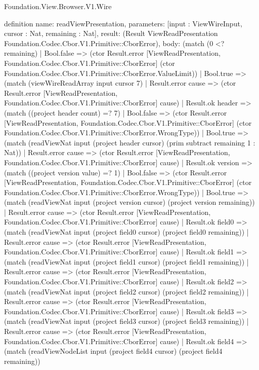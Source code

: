 \begin{lexlean}{Foundation.View.Browser.V1.Wire}
\begin{semanticmodule}
definition{
  name: readViewPresentation,
  parameters: [input : ViewWireInput, cursor : Nat, remaining : Nat],
  result: (Result ViewReadPresentation Foundation.Codec.Cbor.V1.Primitive::CborError),
  body: (match (0 <? remaining)
    | Bool.false => (ctor Result.error [ViewReadPresentation, Foundation.Codec.Cbor.V1.Primitive::CborError] (ctor Foundation.Codec.Cbor.V1.Primitive::CborError.ValueLimit))
    | Bool.true => (match (viewWireReadArray input cursor 7)
      | Result.error cause => (ctor Result.error [ViewReadPresentation, Foundation.Codec.Cbor.V1.Primitive::CborError] cause)
      | Result.ok header => (match ((project header count) =? 7)
        | Bool.false => (ctor Result.error [ViewReadPresentation, Foundation.Codec.Cbor.V1.Primitive::CborError] (ctor Foundation.Codec.Cbor.V1.Primitive::CborError.WrongType))
        | Bool.true => (match (readViewNat input (project header cursor) (prim subtract remaining 1 : Nat))
          | Result.error cause => (ctor Result.error [ViewReadPresentation, Foundation.Codec.Cbor.V1.Primitive::CborError] cause)
          | Result.ok version => (match ((project version value) =? 1)
            | Bool.false => (ctor Result.error [ViewReadPresentation, Foundation.Codec.Cbor.V1.Primitive::CborError] (ctor Foundation.Codec.Cbor.V1.Primitive::CborError.WrongType))
            | Bool.true => (match (readViewNat input (project version cursor) (project version remaining))
              | Result.error cause => (ctor Result.error [ViewReadPresentation, Foundation.Codec.Cbor.V1.Primitive::CborError] cause)
              | Result.ok field0 => (match (readViewNat input (project field0 cursor) (project field0 remaining))
                | Result.error cause => (ctor Result.error [ViewReadPresentation, Foundation.Codec.Cbor.V1.Primitive::CborError] cause)
                | Result.ok field1 => (match (readViewNat input (project field1 cursor) (project field1 remaining))
                  | Result.error cause => (ctor Result.error [ViewReadPresentation, Foundation.Codec.Cbor.V1.Primitive::CborError] cause)
                  | Result.ok field2 => (match (readViewNat input (project field2 cursor) (project field2 remaining))
                    | Result.error cause => (ctor Result.error [ViewReadPresentation, Foundation.Codec.Cbor.V1.Primitive::CborError] cause)
                    | Result.ok field3 => (match (readViewNat input (project field3 cursor) (project field3 remaining))
                      | Result.error cause => (ctor Result.error [ViewReadPresentation, Foundation.Codec.Cbor.V1.Primitive::CborError] cause)
                      | Result.ok field4 => (match (readViewNodeList input (project field4 cursor) (project field4 remaining))
}
\end{semanticmodule}
\end{lexlean}
